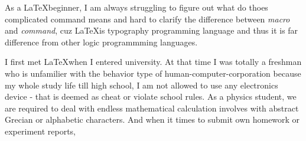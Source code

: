     As a \LaTeX beginner, I am always struggling  to figure out what do thoes complicated command means and hard to clarify the difference between \emph{macro} and \emph{command}, cuz \LaTeX is typography programming language and thus it is far difference from other logic programmming languages. 

    I first met \LaTeX when I entered university. At that time I was totally a freshman who is unfamilier with the behavior type of human-computer-corporation because my whole study life till high school, I am not allowed to use any electronics device - that is deemed as cheat or violate school rules. As a physics student, we are required to deal with endless mathematical calculation involves with abstract Grecian or alphabetic characters. And when it times to submit own homework or experiment reports, 